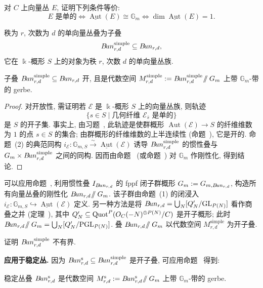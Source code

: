 \begin{exercise}\label{src:9.2.21}
对 $C$ 上向量丛 $E$, 证明下列条件等价:
\[
E\text{ 是单的}\iff\underline{\operatorname{Aut}}(E)\cong\mathbb G_m
\iff\dim\underline{\operatorname{Aut}}(E)=1.
\]
\end{exercise}
\begin{definition}\label{src:9.2.22}
秩为 $r$, 次数为 $d$ 的单向量丛叠为子叠
\[
B\!un_{r,d}^{\mathrm{simple}}\subseteq B\!un_{r,d},
\]
它在 $\Bbbk$-概形 $S$ 上的对象为秩 $r$, 次数 $d$ 的单向量丛族.
\end{definition}
\begin{proposition}\label{src:9.2.23}
子叠 $B\!un_{r,d}^{\mathrm{simple}}\subseteq B\!un_{r,d}$ 开, 且是代数空间 $M_{r,d}^{\mathrm{simple}}:=B\!un_{r,d}^{\mathrm{simple}}\!\mathbin{/\mkern-6mu/}G_m$ 上带 $\mathbb G_m$-带的 gerbe.
\end{proposition}
\begin{proof}
对开放性, 需证明若 $\mathcal E$ 是 $\Bbbk$-概形 $S$ 上的向量丛族, 则轨迹
\[
\{s\in S\mid\text{几何纤维 }\mathcal E_{\overline s}\text{ 是单的}\}
\]
是 $S$ 的开子集. 事实上, 由习题~, 此轨迹是使群概形 $\operatorname{Aut}(\mathcal E)\to S$ 的纤维维数为 $1$ 的点 $s\in S$ 的集合; 由群概形的纤维维数的上半连续性 (命题~), 它是开的. 命题~(2) 的典范同构 $i_{\mathcal E}:\mathbb G_{m,S}\xrightarrow{\sim}\underline{\operatorname{Aut}}(\mathcal E)$ 诱导 $B\!un_{r,d}^{\mathrm{simple}}$ 的惯性叠与 $G_m\times B\!un_{r,d}^{\mathrm{simple}}$ 之间的同构. 因而由命题~ (或命题~) 对 $\mathbb G_m$ 作刚性化, 得到结论.
\end{proof}
\begin{remark}[向量丛叠的刚性化]\label{src:9.2.24}
可以应用命题~, 利用惯性叠 $I_{B\!un_{r,d}}$ 的 fppf 闭子群概形 $G_m:=G_{m,B\!un_{r,d}}$, 构造所有向量丛叠的刚性化 $B\!un_{r,d}\!\mathbin{/\mkern-6mu/}G_m$. 该子群由命题~(1) 的闭浸入 $i_{\mathcal E}:\mathbb G_{m,S}\hookrightarrow\underline{\operatorname{Aut}}(\mathcal E)$ 定义. 另一种方法是将 $B\!un_{r,d}=\bigcup_N[Q_N'/\mathrm{GL}_{P(N)}]$ 看作商叠之并 (定理~), 其中 $Q_N'\subseteq\operatorname{Quot}^P(O_C(-N)^{\oplus P(N)}/C)$ 是开子概形; 此时 $B\!un_{r,d}\!\mathbin{/\mkern-6mu/}G_m=\bigcup_N[Q_N'/\mathrm{PGL}_{P(N)}]$. 叠 $B\!un_{r,d}\!\mathbin{/\mkern-6mu/}G_m$ 以代数空间 $M_{r,d}^{\mathrm{simple}}$ 为开子叠.
\end{remark}
\begin{exercise}\label{src:9.2.25}
证明 $B\!un_{r,d}^{\mathrm{simple}}$ 不有界.
\end{exercise}
\textbf{应用于稳定丛.} 因为 $B\!un_{r,d}^{\mathrm s}\subseteq B\!un_{r,d}^{\mathrm{simple}}$ 是开子叠, 可应用命题~ 得到:
\begin{corollary}\label{src:9.2.26}
稳定丛叠 $B\!un_{r,d}^{\mathrm s}$ 是代数空间 $M_{r,d}^{\mathrm s}:=B\!un_{r,d}^{\mathrm s}\!\mathbin{/\mkern-6mu/}G_m$ 上带 $\mathbb G_m$-带的 gerbe.
\end{corollary}
